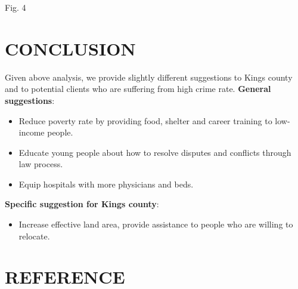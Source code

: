 \documentclass[preprint,12pt,3p]{elsarticle}
\begin{document}
\begin{center}
  \caption{Fig. 4}
\end{center}


\section{CONCLUSION}
\label{sec4}
Given above analysis, we provide slightly different suggestions to Kings county and to potential clients who are suffering from high crime rate.
\bigbreak
\textbf{General suggestions}:
\begin{itemize}
  \setlength\itemsep{0em}
  \item Reduce poverty rate by providing food, shelter and career training to low-income people.
  \item Educate young people about how to resolve disputes and conflicts through law process.
\item Equip hospitals with more physicians and beds.
\end{itemize}
\bigbreak
\textbf{Specific suggestion for Kings county}:
\begin{itemize}
\item Increase effective land area, provide assistance to people who are willing to relocate.
\end{itemize}


\section{REFERENCE}
\label{sec5}
\end{document}
